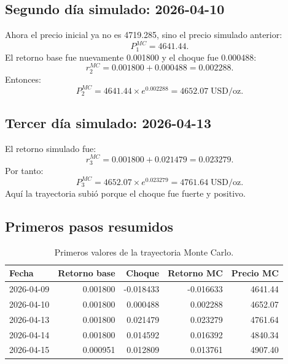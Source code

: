\documentclass[12pt,letterpaper]{article}
\begin{document}
\subsection{Segundo día simulado: 2026-04-10}
Ahora el precio inicial ya no es 4719.285, sino el precio simulado anterior:
\begin{equation}
P_1^{MC}=4641.44.
\end{equation}
El retorno base fue nuevamente 0.001800 y el choque fue 0.000488:
\begin{equation}
r_2^{MC}=0.001800+0.000488=0.002288.
\end{equation}
Entonces:
\begin{equation}
P_2^{MC}=4641.44\times e^{0.002288}=4652.07\;\text{USD/oz}.
\end{equation}

\subsection{Tercer día simulado: 2026-04-13}
El retorno simulado fue:
\begin{equation}
r_3^{MC}=0.001800+0.021479=0.023279.
\end{equation}
Por tanto:
\begin{equation}
P_3^{MC}=4652.07\times e^{0.023279}=4761.64\;\text{USD/oz}.
\end{equation}
Aquí la trayectoria subió porque el choque fue fuerte y positivo.

\subsection{Primeros pasos resumidos}
\begin{table}[H]
\centering
\caption{Primeros valores de la trayectoria Monte Carlo.}
\begin{tabular}{lrrrr}
\toprule
Fecha & Retorno base & Choque & Retorno MC & Precio MC \\
\midrule
2026-04-09 & 0.001800 & -0.018433 & -0.016633 & 4641.44 \\
2026-04-10 & 0.001800 & 0.000488 & 0.002288 & 4652.07 \\
2026-04-13 & 0.001800 & 0.021479 & 0.023279 & 4761.64 \\
2026-04-14 & 0.001800 & 0.014592 & 0.016392 & 4840.34 \\
2026-04-15 & 0.000951 & 0.012809 & 0.013761 & 4907.40 \\
\bottomrule
\end{tabular}
\end{table}
\end{document}
